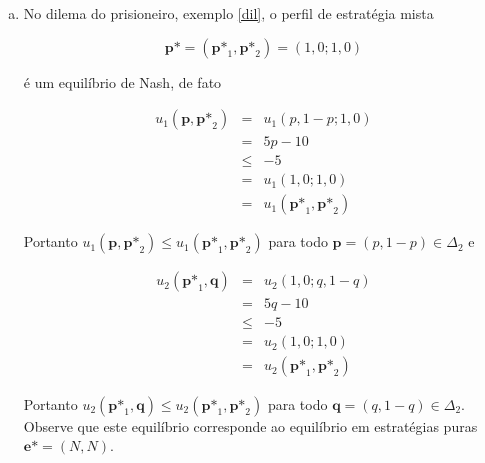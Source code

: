 \begin{ex}
\begin{enumerate}[a)]
\item No dilema do prisioneiro, exemplo \ref{dil}, o perfil de estratégia mista

\begin{equation}\nonumber
\textbf{p*}=\left(\textbf{p*}_1,\textbf{p*}_2\right)=(1,0;1,0)
\end{equation}\vspace{0.1cm}

é um equilíbrio de Nash, de fato

\begin{eqnarray}
u_1\left(\textbf{p},\textbf{p*}_2\right) & = & u_1\left(p,1-p;1,0\right)\nonumber\\
 & = & 5p-10\nonumber\\
 & \leq & -5\nonumber\\
 & = & u_1\left(1,0;1,0\right)\nonumber\\
 & = & u_1\left(\textbf{p*}_1,\textbf{p*}_2\right)\nonumber
\end{eqnarray}

Portanto $u_1\left(\textbf{p},\textbf{p*}_2\right)\leq u_1\left(\textbf{p*}_1,\textbf{p*}_2\right)$ para todo $\textbf{p}=(p,1-p)\in\Delta_2$ e 

\begin{eqnarray}
u_2\left(\textbf{p*}_1,\textbf{q}\right) & = & u_2\left(1,0;q,1-q\right)\nonumber\\
 & = & 5q-10\nonumber\\
 & \leq & -5\nonumber\\
 & = & u_2\left(1,0;1,0\right)\nonumber\\
 & = & u_2\left(\textbf{p*}_1,\textbf{p*}_2\right)\nonumber
\end{eqnarray}

Portanto $u_2\left(\textbf{p*}_1,\textbf{q}\right)\leq u_2\left(\textbf{p*}_1,\textbf{p*}_2\right)$ para todo $\textbf{q}=(q,1-q)\in\Delta_2$. Observe que este equilíbrio corresponde ao equilíbrio em estratégias puras $\textbf{e*} = (N,N)$.

\end{enumerate}
\end{ex}


%


